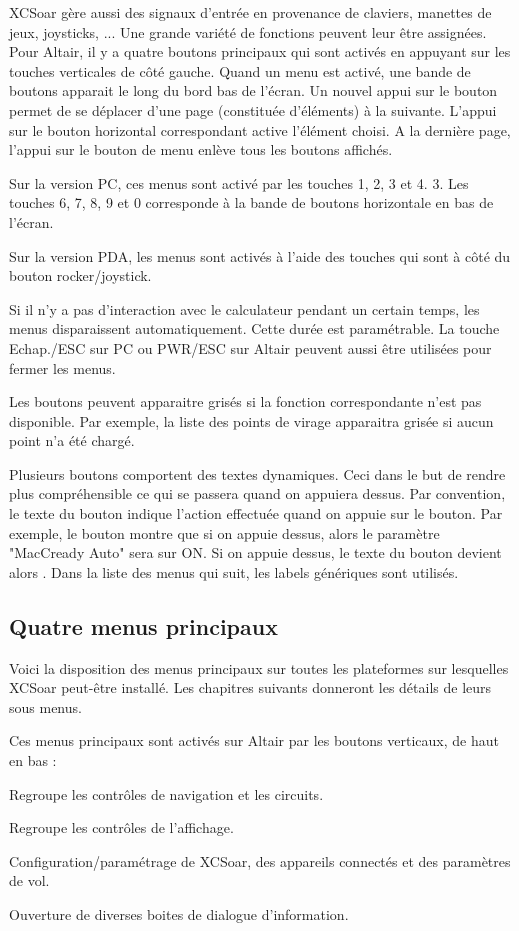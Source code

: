 XCSoar gère aussi des signaux d'entrée en provenance de claviers, manettes de jeux, joysticks, ... Une grande variété de fonctions peuvent leur être assignées.
Pour Altair, il y a quatre boutons principaux qui sont activés en appuyant sur les touches verticales de côté gauche. Quand un menu est activé, une bande de boutons apparait le long du bord bas de l'écran. Un nouvel appui sur le bouton permet de se déplacer d'une page (constituée d'éléments) à la suivante. L'appui sur le bouton horizontal correspondant active l'élément choisi. A la dernière page, l'appui sur le bouton de menu enlève tous les boutons affichés.

Sur la version PC, ces menus sont activé par les touches 1, 2, 3 et 4. 3. Les touches 6, 7, 8, 9 et 0 corresponde à la bande de boutons horizontale en bas de l'écran.

Sur la version PDA, les menus sont activés à l'aide des touches qui sont à côté du bouton rocker/joystick.

Si il n'y a pas d'interaction avec le calculateur pendant un certain temps, les menus disparaissent automatiquement. Cette durée est paramétrable. La touche Echap./ESC sur PC ou PWR/ESC sur Altair peuvent aussi être utilisées pour fermer les menus. 

Les boutons peuvent apparaitre grisés si la fonction correspondante n'est pas disponible. Par exemple, la liste des points de virage apparaitra grisée si aucun point n'a été chargé.

Plusieurs boutons comportent des textes dynamiques. Ceci dans le but de rendre plus compréhensible ce qui se passera quand on appuiera dessus. Par convention, le texte du bouton indique l'action effectuée quand on appuie sur le bouton. Par exemple, le bouton  montre que si on appuie dessus, alors le paramètre "MacCready Auto" sera sur ON. Si on appuie dessus, le texte du bouton devient alors . Dans la liste des menus qui suit, les labels génériques sont utilisés.

\subsection*{Quatre menus principaux}
Voici la disposition des menus principaux sur toutes les plateformes sur lesquelles XCSoar peut-être installé. Les chapitres suivants donneront les détails de leurs sous menus.

Ces menus principaux sont activés sur Altair par les boutons verticaux, de haut en bas :
\begin{jspecs}
\item[\bmenu{Nav.}] Regroupe les contrôles de navigation et les circuits.
\item[\bmenu{Affich.}] Regroupe les contrôles de l'affichage.
\item[\bmenu{Config.}] Configuration/paramétrage de XCSoar, des appareils connectés et des paramètres de vol.
\item[\bmenu{Info.}] Ouverture de diverses boites de dialogue d'information. 
\end{jspecs}

